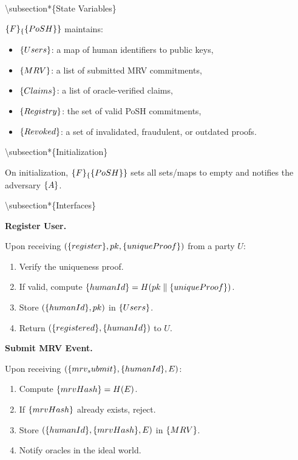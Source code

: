 \documentclass{article}
\begin{document}
{\textbackslash}subsection*\{State Variables\}

$\mathcal\{F\}_\{\textsf\{PoSH\}\}$ maintains:

\begin{itemize}
\item $\mathsf\{Users\}$: a map of human identifiers to public keys,
\item $\mathsf\{MRV\}$: a list of submitted MRV commitments,
\item $\mathsf\{Claims\}$: a list of oracle-verified claims,
\item $\mathsf\{Registry\}$: the set of valid PoSH commitments,
\item $\mathsf\{Revoked\}$: a set of invalidated, fraudulent, or outdated proofs.
\end{itemize}

{\textbackslash}subsection*\{Initialization\}

On initialization, $\mathcal\{F\}_\{\textsf\{PoSH\}\}$ sets all sets/maps to empty
and notifies the adversary $\mathcal\{A\}$.

{\textbackslash}subsection*\{Interfaces\}

\textbf{Register User.}

Upon receiving $(\textsf\{register\}, pk, \mathsf\{uniqueProof\})$ from a party $U$:

\begin{enumerate}
\item Verify the uniqueness proof.
\item If valid, compute $\mathsf\{humanId\} = H(pk \parallel \mathsf\{uniqueProof\})$.
\item Store $(\mathsf\{humanId\}, pk)$ in $\mathsf\{Users\}$.
\item Return $(\textsf\{registered\}, \mathsf\{humanId\})$ to $U$.
\end{enumerate}

\textbf{Submit MRV Event.}

Upon receiving $(\textsf\{mrv_submit\}, \mathsf\{humanId\}, E)$:

\begin{enumerate}
\item Compute $\mathsf\{mrvHash\} = H(E)$.
\item If $\mathsf\{mrvHash\}$ already exists, reject.
\item Store $(\mathsf\{humanId\}, \mathsf\{mrvHash\}, E)$ in $\mathsf\{MRV\}$.
\item Notify oracles in the ideal world.
\end{enumerate}
\end{document}
